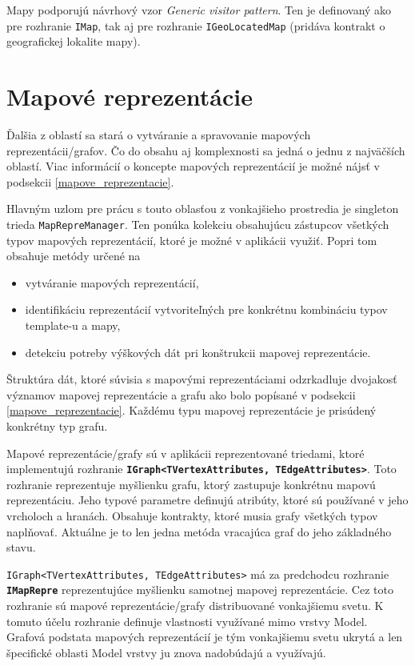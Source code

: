 Mapy podporujú návrhový vzor \textit{Generic visitor pattern}. Ten je definovaný ako pre rozhranie \texttt{IMap}, tak aj pre rozhranie \texttt{IGeoLocatedMap} (pridáva kontrakt o geografickej lokalite mapy).

\section{Mapové reprezentácie}

Ďalšia z oblastí sa stará o vytváranie a spravovanie mapových reprezentácii/grafov. Čo do obsahu aj komplexnosti sa jedná o jednu z najväčších oblastí. Viac informácií o koncepte mapových reprezentácií je možné nájsť v podsekcii \ref{mapove_reprezentacie}.

Hlavným uzlom pre prácu s touto oblasťou z vonkajšieho prostredia je singleton trieda \texttt{MapRepreManager}. Ten ponúka kolekciu obsahujúcu zástupcov všetkých typov mapových reprezentácií, ktoré je možné v aplikácii využiť. Popri tom obsahuje metódy určené na 
\begin{itemize}
    \item vytváranie mapových reprezentácií,
    \item identifikáciu reprezentácií vytvoriteľných pre konkrétnu kombináciu typov template-u a mapy,
    \item detekciu potreby výškových dát pri konštrukcii mapovej reprezentácie.
\end{itemize}

\bigskip

Štruktúra dát, ktoré súvisia s mapovými reprezentáciami odzrkadluje dvojakosť významov mapovej reprezentácie a grafu ako bolo popísané v podsekcii \ref{mapove_reprezentacie}. Každému typu mapovej reprezentácie je prisúdený konkrétny typ grafu.

Mapové reprezentácie/grafy sú v aplikácii reprezentované triedami, ktoré implementujú rozhranie \textbf{\texttt{IGraph<TVertexAttributes, TEdgeAttributes>}}. Toto rozhranie reprezentuje myšlienku grafu, ktorý zastupuje konkrétnu mapovú reprezentáciu. Jeho typové parametre definujú atribúty, ktoré sú používané v jeho vrcholoch a hranách. Obsahuje kontrakty, ktoré musia grafy všetkých typov naplňovať. Aktuálne je to len jedna metóda vracajúca graf do jeho základného stavu.

\texttt{IGraph<TVertexAttributes, TEdgeAttributes>} má za predchodcu rozhranie \textbf{\texttt{IMapRepre}} reprezentujúce myšlienku samotnej mapovej reprezentácie. Cez toto rozhranie sú mapové reprezentácie/grafy distribuované vonkajšiemu svetu. K tomuto účelu rozhranie definuje vlastnosti využívané mimo vrstvy Model. Grafová podstata mapových reprezentácií je tým vonkajšiemu svetu ukrytá a len špecifické oblasti Model vrstvy ju znova nadobúdajú a využívajú.

